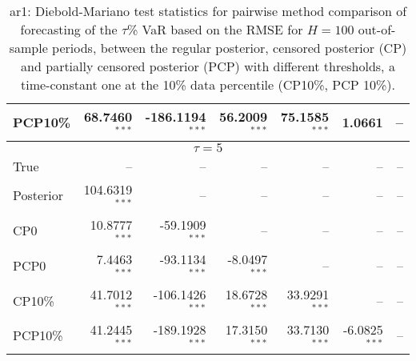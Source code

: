 {{\begin{table}
\begin{tabular}{l | rrrrrr}
PCP10\% & 68.7460$^{***}$ & -186.1194$^{***}$ & 56.2009$^{***}$ & 75.1585$^{***}$ & 1.0661\phantom{$^{***}$} &    --\phantom{$^{***}$}   \\ 
\hline 
\multicolumn{7}{c}{$\tau = 5$} \\ \hline 
True &    --\phantom{$^{***}$} &    --\phantom{$^{***}$} &    --\phantom{$^{***}$} &    --\phantom{$^{***}$} &    --\phantom{$^{***}$} &    --\phantom{$^{***}$}   \\ 
Posterior & 104.6319$^{***}$ &    --\phantom{$^{***}$} &    --\phantom{$^{***}$} &    --\phantom{$^{***}$} &    --\phantom{$^{***}$} &    --\phantom{$^{***}$}   \\ 
CP0 & 10.8777$^{***}$ & -59.1909$^{***}$ &    --\phantom{$^{***}$} &    --\phantom{$^{***}$} &    --\phantom{$^{***}$} &    --\phantom{$^{***}$}   \\ 
PCP0 & 7.4463$^{***}$ & -93.1134$^{***}$ & -8.0497$^{***}$ &    --\phantom{$^{***}$} &    --\phantom{$^{***}$} &    --\phantom{$^{***}$}   \\ 
CP10\% & 41.7012$^{***}$ & -106.1426$^{***}$ & 18.6728$^{***}$ & 33.9291$^{***}$ &    --\phantom{$^{***}$} &    --\phantom{$^{***}$}   \\ 
PCP10\% & 41.2445$^{***}$ & -189.1928$^{***}$ & 17.3150$^{***}$ & 33.7130$^{***}$ & -6.0825$^{***}$ &    --\phantom{$^{***}$}   \\ 
\hline 
\end{tabular}
 \caption{ar1: Diebold-Mariano test statistics for pairwise method comparison  of forecasting of the $\tau$\%  VaR  based on  the RMSE for $H=100$ out-of-sample periods,  between  the regular posterior, censored posterior (CP) and  partially censored posterior (PCP) with different thresholds,  a time-constant one at the 10\% data percentile (CP10\%, PCP 10\%). }
\label{tab:ar1_DM__T10000}  
\end{table}
}}